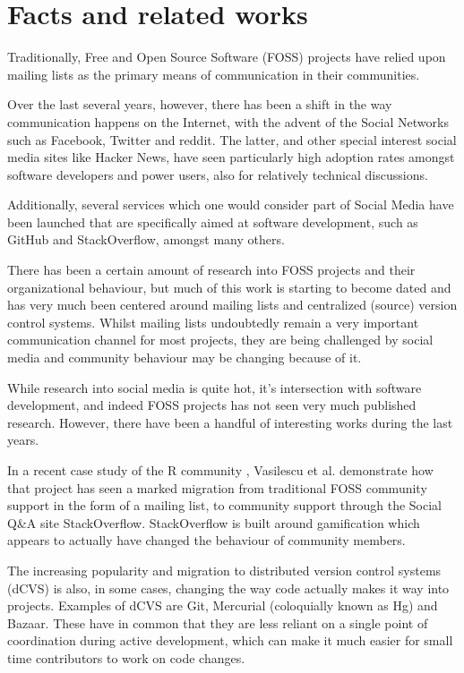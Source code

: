 \documentclass[a4paper,11pt]{article} %
\begin{document}
\section{Facts and related works}

Traditionally, Free and Open Source Software (FOSS) projects have
relied upon mailing lists as the primary means of communication in
their communities. %

Over the last several years, however, there has been a shift in the
way communication happens on the Internet, with the advent of the
Social Networks such as Facebook, Twitter and reddit. The latter, and
other special interest social media sites like Hacker News, have seen
particularly high adoption rates amongst software developers and power
users, also for relatively technical discussions.

Additionally, several services which one would consider part of Social
Media have been launched that are specifically aimed at software
development, such as GitHub and StackOverflow, amongst many others.

There has been a certain amount of research into FOSS projects and
their organizational behaviour, but much of this work is starting to
become dated and has very much been centered around mailing lists and
centralized (source) version control systems. Whilst mailing
lists undoubtedly remain a very important communication channel for
most projects, they are being challenged by social media and community
behaviour may be changing because of it.

While research into social media is quite hot, it's intersection with
software development, and indeed FOSS projects has not seen very much
published research. However, there have been a handful of interesting
works during the last years.

In a recent case study of the R community
\cite{Vasilescu14StackOverflow}, Vasilescu et al. demonstrate how that
project has seen a marked migration from traditional FOSS community
support in the form of a mailing list, to community support through
the Social Q\&{}A site StackOverflow. StackOverflow is built around
gamification which appears to actually have changed the
behaviour of community members.



The increasing popularity and migration to distributed version control
systems (dCVS) is also, in some cases, changing the way code actually
makes it way into projects. Examples of dCVS are Git, Mercurial
(coloquially known as Hg) and Bazaar. These have in common that they
are less reliant on a single point of coordination during active
development, which can make it much easier for small time contributors
to work on code changes.
\end{document}
